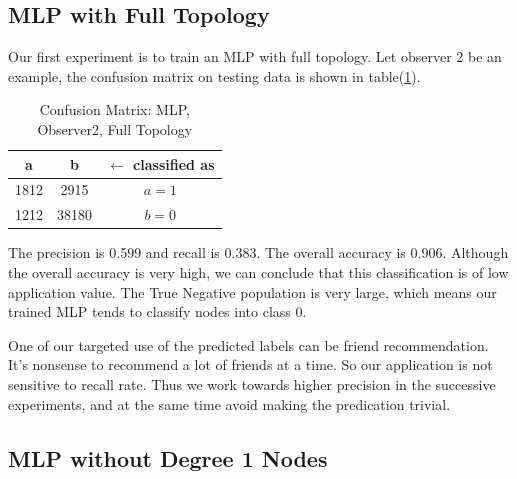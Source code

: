 \documentclass[11pt,a4paper]{article}
\begin{document}
%
%
%


\subsection{MLP with Full Topology}

Our first experiment is to train an MLP with full topology. 
Let observer 2 be an example, the confusion matrix on testing 
data is shown in table(\ref{tbl:cm_o2_full}). 

\begin{table}[htb]
	\centering
	\caption{Confusion Matrix: MLP, Observer2, Full Topology}
	\label{tbl:cm_o2_full}
	\begin{tabular}{cc|c}
	\hline
a & b & \textbf{$\leftarrow$ classified as}\\	
	\hline
1812 &  2915 &    $a = 1$ \\
1212 & 38180 &    $b = 0$\\
	\hline
	\end{tabular}
\end{table}

The precision is 0.599 and recall is 0.383. The overall accuracy 
is 0.906. Although the overall accuracy is very high, we can 
conclude that this classification is of low application value. 
The True Negative population is very large, which means our trained 
MLP tends to classify nodes into class 0. 

One of our targeted use of the predicted labels can be friend 
recommendation. It's nonsense to recommend a lot of friends 
at a time. So our application is not sensitive to recall rate. 
Thus we work towards higher precision in the successive experiments, 
and at the same time avoid making the predication trivial. 

\subsection{MLP without Degree 1 Nodes}
\end{document}
